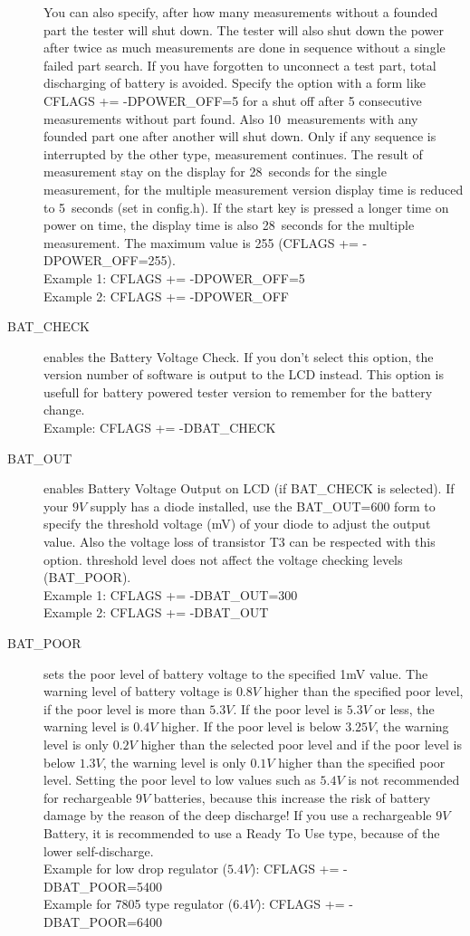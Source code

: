 \begin{description}
You can also specify, after how many measurements without a founded part the tester will shut down.
The tester will also shut down the power after twice as much measurements are done in sequence without a
single failed part search. If you have forgotten to unconnect a test part, total discharging of battery is avoided. 
Specify the option with a form like CFLAGS += -DPOWER\_OFF=5 for a shut off after 5 consecutive measurements
without part found. Also 10~measurements with any founded part one after another will shut down.
Only if any sequence is interrupted by the other type, measurement continues.
The result of measurement stay on the display for 28~seconds for the single measurement, for the
multiple measurement version display time is reduced to 5~seconds (set in config.h).
If the start key is pressed a longer time on power on time, the display time is also 28~seconds for the multiple measurement.
The maximum value is 255 (CFLAGS += -DPOWER\_OFF=255).\\
Example 1: CFLAGS += -DPOWER\_OFF=5\\
Example 2: CFLAGS += -DPOWER\_OFF

  \item[BAT\_CHECK] enables the Battery Voltage Check. If you don't select this option, the version number of
software is output to the LCD instead.
This option is usefull for battery powered tester version to remember for the battery change.\\
Example: CFLAGS += -DBAT\_CHECK

  \item[BAT\_OUT] enables Battery Voltage Output on LCD (if BAT\_CHECK is selected).
 If your \(9V\) supply has a diode installed, use the BAT\_OUT=600 form to specify the threshold voltage (mV) of your diode
to adjust the output value.
Also the voltage loss of transistor T3 can be respected with this option.
 threshold level does not affect the voltage checking levels (BAT\_POOR).\\
Example 1: CFLAGS += -DBAT\_OUT=300\\
Example 2: CFLAGS += -DBAT\_OUT

  \item[BAT\_POOR] sets the poor level of battery voltage to the specified 1mV value.
The warning level of battery voltage is \(0.8V\) higher than the specified poor level, if the poor level is more than \(5.3V\).
If the poor level is \(5.3V\) or less, the warning level is \(0.4V\) higher. If the poor level is below \(3.25V\), the
warning level is only \(0.2V\) higher than the selected poor level and if the poor level is below \(1.3V\), the
warning level is only \(0.1V\) higher than the specified poor level.
Setting the poor level to low values such as \(5.4V\) is not recommended for rechargeable \(9V\) batteries,
because this increase the risk of battery damage by the reason of the deep discharge!
If you use a rechargeable \(9V\) Battery, it is recommended to use a Ready To Use type, because of the lower self-discharge.\\
Example for low drop regulator (\(5.4V\)): CFLAGS += -DBAT\_POOR=5400\\
Example for 7805 type regulator (\(6.4V\)): CFLAGS += -DBAT\_POOR=6400


\end{description}
